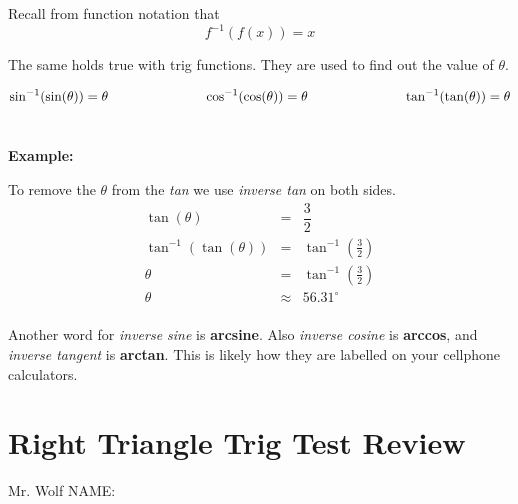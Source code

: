 \documentclass[12pt]{article}
\begin{document}
Recall from function notation that $$f^{-1}(f(x))=x$$

The same holds true with trig functions. They are used to find out the value of $\theta$. \\

\begin{large}
$$\sin^{-1}(\sin(\theta))=\theta \hspace{1in} \cos^{-1}(\cos(\theta))=\theta \hspace*{1in} \tan^{-1}(\tan(\theta))=\theta$$\\
\end{large}

\textbf{Example:}

\begin{center}
\end{center}

To remove the $\theta$ from the \textsl{tan} we use \textit{inverse tan} on both sides.\\

\begin{eqnarray*}
\tan(\theta)&=&\dfrac{3}{2}\\
\tan^{-1}(\tan(\theta))&=&\tan^{-1}\left(\frac{3}{2}\right) \\
\theta &=&\tan^{-1}\left(\frac{3}{2}\right) \\
\theta &\approx & 56.31^\circ \\
\end{eqnarray*}

Another word for \textit{inverse sine} is \textbf{arcsine}. Also \textit{inverse cosine} is \textbf{arccos}, and \textit{inverse tangent} is \textbf{arctan}. This is likely how they are labelled on your cellphone calculators.

\section*{Right Triangle Trig Test Review}

Mr. Wolf \hfill NAME:\underline{\hspace{3in}}
\end{document}
